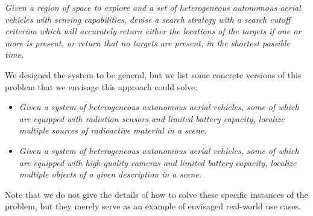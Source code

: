 \textit{Given a region of space to explore and a set of heterogeneous autonomous aerial vehicles with sensing capabilities, devise a search strategy with a search cutoff criterion which will accurately return either the locations of the targets if one or more is present, or return that no targets are present, in the shortest possible time.} \par

We designed the system to be general, but we list some concrete versions of this problem that we envisage this approach could solve:
\begin{itemize}
    \item \textit{Given a system of heterogeneous autonomous aerial vehicles, some of which are equipped with radiation sensors and limited battery capacity, localize multiple sources of radioactive material in a scene.}
    \item \textit{Given a system of heterogeneous autonomous aerial vehicles, some of which are equipped with high-quality cameras and limited battery capacity, localize multiple objects of a given description in a scene.}
\end{itemize}
Note that we do not give the details of how to solve these specific instances of the problem, but they merely serve as an example of envisaged real-world use cases.
\par


